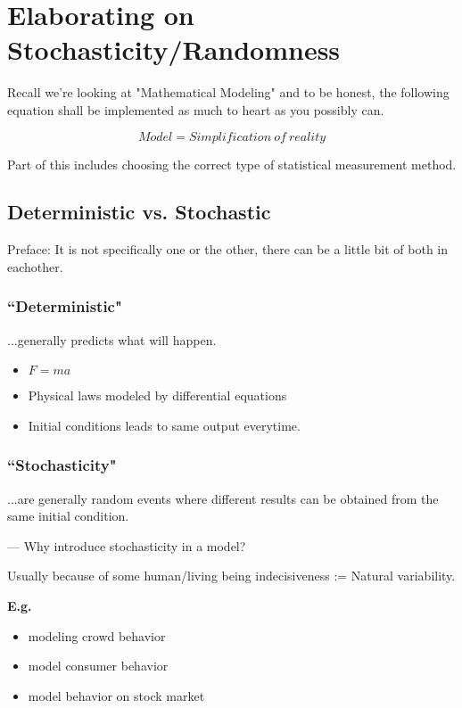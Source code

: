 \documentclass[12pt]{book}
\begin{document}
\chapter{Elaborating on \\Stochasticity/Randomness}
\indent Recall we're looking at "Mathematical Modeling"
and to be honest, the following equation shall be implemented as much to heart as you possibly can.

$$Model = Simplification~of~reality$$

\noindent Part of this includes choosing the correct type of statistical measurement method.

\section{Deterministic vs. Stochastic} 
Preface: It is not specifically one or the other, there can be a little bit of both in eachother.\\


\newpage
\subsection{``Deterministic"}
...generally predicts what will happen.
\begin{itemize}
\item $F=ma$
\item Physical laws modeled by differential equations
\item Initial conditions leads to same output everytime.
\end{itemize}

\subsection{``Stochasticity"}
...are generally random events where different results can be obtained from the same initial condition.

--- Why introduce stochasticity in a model?

\noindent Usually because of some human/living being indecisiveness := Natural variability. 

\noindent \textbf{E.g.}
\begin{itemize}
\item modeling crowd behavior
\item model consumer behavior
\item model behavior on stock market
\end{itemize}
\end{document}
